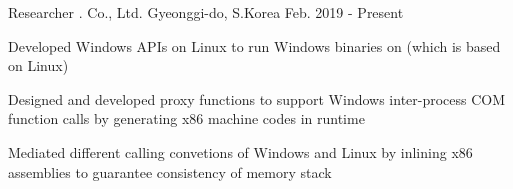 

\begin{cvskills}

  \cventry
    {Researcher} %
    {\mycompany{}. Co., Ltd.} %
    {Gyeonggi-do, S.Korea} %
    {Feb. 2019 - Present} %
    {
      \begin{cvitems} %
        \item {Developed Windows APIs on Linux to run Windows binaries on \mycompany{} (which is based on Linux)}
	\item {Designed and developed proxy functions to support Windows inter-process COM function calls by generating x86 machine codes in runtime}
	\item {Mediated different calling convetions of Windows and Linux by inlining x86 assemblies to guarantee consistency of memory stack}
      \end{cvitems}
    }




\end{cvskills}

